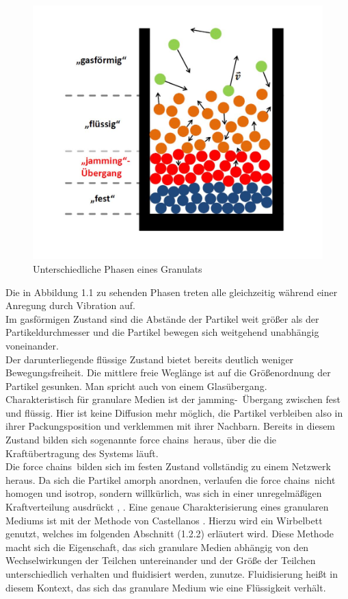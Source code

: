 \begin{center}
\begin{figure}[h]
	\includegraphics[scale=0.45]{Einleitung_1.jpg}
	\caption{Unterschiedliche Phasen eines Granulats  \cite{Darmstadt2015}}
\end{figure}	
\end{center}

Die in Abbildung 1.1 zu sehenden Phasen treten alle gleichzeitig während einer Anregung durch Vibration auf. \\
Im gasförmigen Zustand sind die Abstände der Partikel weit größer als der Partikeldurchmesser und die Partikel bewegen sich weitgehend unabhängig voneinander. \\
Der darunterliegende flüssige Zustand bietet bereits deutlich weniger Bewegungsfreiheit. Die mittlere freie Weglänge ist auf die Größenordnung der Partikel gesunken. Man spricht auch von einem Glasübergang. \\
Charakteristisch für granulare Medien ist der \glqq jamming\grqq-\ Übergang zwischen fest und flüssig. Hier ist keine Diffusion mehr möglich, die Partikel verbleiben also in ihrer Packungsposition und verklemmen mit ihrer Nachbarn. Bereits in diesem Zustand bilden sich sogenannte \glqq force chains\grqq \ heraus, über die die Kraftübertragung des Systems läuft. \\
Die \glqq force chains\grqq \ bilden sich im festen Zustand vollständig zu einem Netzwerk heraus. Da sich die Partikel amorph anordnen, verlaufen die \glqq force chains\grqq \ nicht homogen und isotrop, sondern willkürlich, was sich in einer unregelmäßigen Kraftverteilung ausdrückt \cite{Darmstadt2015}, \cite{Fallturmexperiment}.
Eine genaue Charakterisierung eines granularen Mediums ist mit der Methode von Castellanos \cite{Castellanos2000}. Hierzu wird ein Wirbelbett genutzt, welches im folgenden Abschnitt (1.2.2) erläutert wird. Diese Methode macht sich die Eigenschaft, das sich granulare Medien abhängig von den Wechselwirkungen der Teilchen untereinander und der Größe der Teilchen unterschiedlich verhalten und fluidisiert werden, zunutze. Fluidisierung heißt in diesem Kontext, das sich das granulare Medium wie eine Flüssigkeit verhält.

